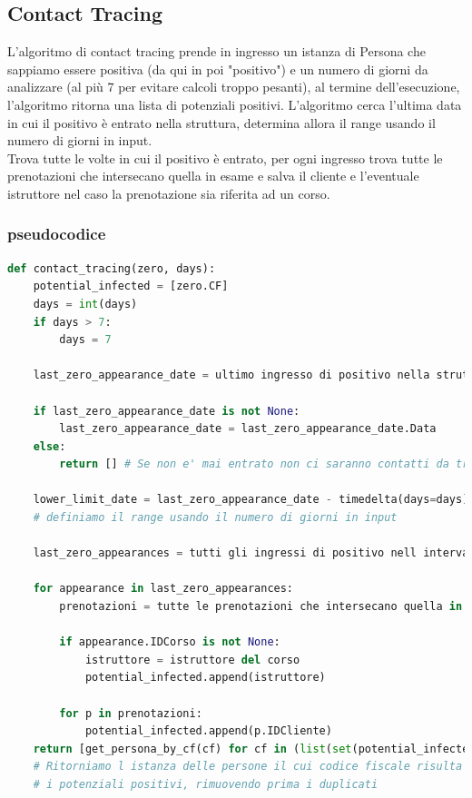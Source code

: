 \documentclass[a4paper,11pt,titlepage]{article}
\begin{document}
\subsection{Contact Tracing}
L'algoritmo di contact tracing prende in ingresso un istanza di Persona che sappiamo essere positiva (da qui in poi "positivo") e un numero di giorni da analizzare (al più 7 per evitare calcoli troppo pesanti), al termine dell'esecuzione, l'algoritmo ritorna una lista di potenziali positivi. L'algoritmo cerca l'ultima data in cui il positivo è entrato nella struttura, determina allora il range usando il numero di giorni in input.\\
Trova tutte le volte in cui il positivo è entrato, per ogni ingresso trova tutte le prenotazioni che intersecano quella in esame e salva il cliente e l'eventuale istruttore nel caso la prenotazione sia riferita ad un corso.
\subsubsection{pseudocodice}
\begin{lstlisting}[language=Python]
def contact_tracing(zero, days):
    potential_infected = [zero.CF]
    days = int(days)
    if days > 7:
        days = 7

    last_zero_appearance_date = ultimo ingresso di positivo nella struttura
    
    if last_zero_appearance_date is not None:
        last_zero_appearance_date = last_zero_appearance_date.Data
    else:
        return [] # Se non e' mai entrato non ci saranno contatti da tracciare
        
    lower_limit_date = last_zero_appearance_date - timedelta(days=days)
    # definiamo il range usando il numero di giorni in input
    
    last_zero_appearances = tutti gli ingressi di positivo nell intervallo

    for appearance in last_zero_appearances:
        prenotazioni = tutte le prenotazioni che intersecano quella in esame

        if appearance.IDCorso is not None:
            istruttore = istruttore del corso
            potential_infected.append(istruttore)

        for p in prenotazioni:
            potential_infected.append(p.IDCliente)
    return [get_persona_by_cf(cf) for cf in (list(set(potential_infected)))]
    # Ritorniamo l istanza delle persone il cui codice fiscale risulta tra
    # i potenziali positivi, rimuovendo prima i duplicati
\end{lstlisting}
\end{document}
